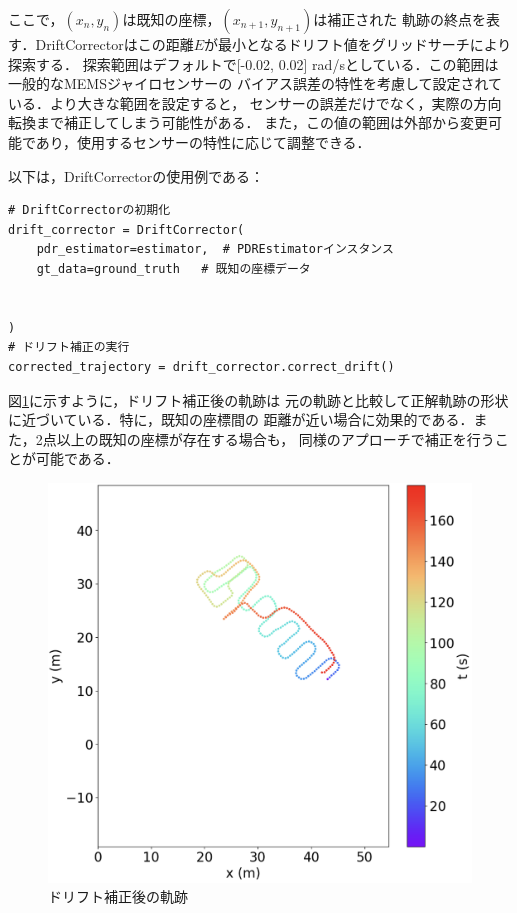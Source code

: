 ここで，$(x_n, y_n)$は既知の座標，$(x_{n+1}, y_{n+1})$は補正された
軌跡の終点を表す．DriftCorrectorはこの距離$E$が最小となるドリフト値をグリッドサーチにより探索する．
探索範囲はデフォルトで[-0.02, 0.02] rad/sとしている．この範囲は一般的なMEMSジャイロセンサーの
バイアス誤差の特性を考慮して設定されている．より大きな範囲を設定すると，
センサーの誤差だけでなく，実際の方向転換まで補正してしまう可能性がある．
また，この値の範囲は外部から変更可能であり，使用するセンサーの特性に応じて調整できる．

以下は，DriftCorrectorの使用例である：
\begin{lstlisting}
# DriftCorrectorの初期化
drift_corrector = DriftCorrector(
    pdr_estimator=estimator,  # PDREstimatorインスタンス
    gt_data=ground_truth   # 既知の座標データ


)
# ドリフト補正の実行
corrected_trajectory = drift_corrector.correct_drift()
\end{lstlisting}

図\ref{fig:pdr-remove-drift}に示すように，ドリフト補正後の軌跡は
元の軌跡と比較して正解軌跡の形状に近づいている．特に，既知の座標間の
距離が近い場合に効果的である．また，2点以上の既知の座標が存在する場合も，
同様のアプローチで補正を行うことが可能である．

\begin{figure}[H]
	\centering
	\includegraphics[width=\linewidth]{image/pdr-remove-drift-two.jpg}
	\caption{ドリフト補正後の軌跡}    \label{fig:pdr-remove-drift}
\end{figure}

